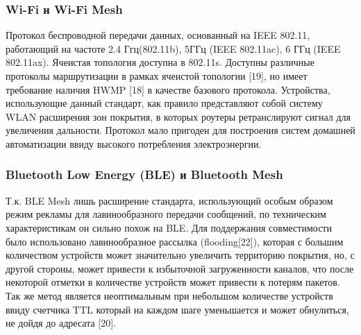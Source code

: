 \documentclass[a4paper,12pt]{article}
\begin{document}


\subsubsection{Wi-Fi и Wi-Fi Mesh}
Протокол беспроводной передачи данных, основанный на IEEE 802.11, работающий на частоте 2.4 Ггц(802.11b), 5ГГц (IEEE 802.11ac), 6 ГГц (IEEE 802.11ax). Ячеистая топология доступна в 802.11s. Доступны различные протоколы маршрутизации в рамках ячеистой топологии [19], но имеет требование наличия HWMP [18] в качестве базового протокола. Устройства, использующие данный стандарт, как правило представляют собой систему WLAN расширения зон покрытия, в которых роутеры ретранслируют сигнал для увеличения дальности. Протокол мало пригоден для построения систем домашней автоматизации ввиду высокого потребления электроэнергии.

\subsubsection{Bluetooth Low Energy (BLE) и Bluetooth Mesh}
Т.к. BLE Mesh лишь расширение стандарта, использующий особым образом режим рекламы для лавинообразного передачи сообщений, по техническим характеристикам он сильно похож на BLE. Для поддержания совместимости было использовано лавинообразное рассылка (flooding[22]), которая с большим количеством устройств может значительно увеличить территорию покрытия, но, с другой стороны, может привести к избыточной загруженности каналов, что после некоторой отметки в количестве устройств может привести к потерям пакетов. Так же метод является неоптимальным при небольшом количестве устройств ввиду счетчика TTL который на каждом шаге уменьшается и может обнулиться, не дойдя до адресата [20].
\end{document}
